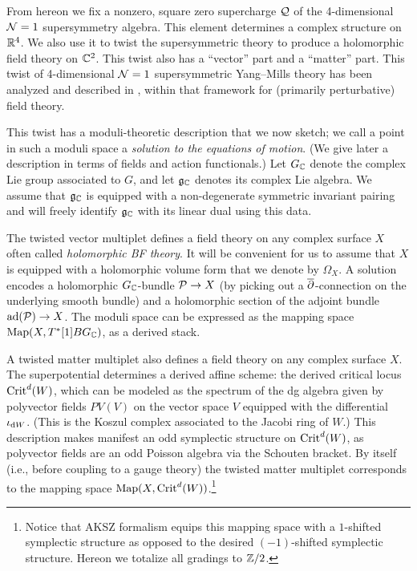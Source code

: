\documentclass[11pt]{amsart}
\begin{document}
From hereon we fix a nonzero, square zero supercharge $\mathcal Q$ of the 4-dimensional $\mathcal N=1$ supersymmetry algebra.
This element determines a complex structure on $\mathbb R^4$.
We also use it to twist the supersymmetric theory to produce a holomorphic field theory on $\mathbb C^2$.
This twist also has a ``vector'' part and a ``matter'' part.
This twist of 4-dimensional $\mathcal N=1$ supersymmetric Yang--Mills theory has been analyzed and described in \cite{CosYangian, ESW, SWchar}, within that framework for (primarily perturbative) field theory.

This twist has a moduli-theoretic description that we now sketch;
we call a point in such a moduli space a {\it solution to the equations of motion}. 
(We give later a description in terms of fields and action functionals.)
Let $G_\mathbb C$ denote the complex Lie group associated to $G$,
and let $\mathfrak g_\mathbb C$ denotes its complex Lie algebra.
We assume that $\mathfrak g_\mathbb C$ is equipped with a non-degenerate symmetric invariant pairing and will freely identify $\mathfrak g_\mathbb C$ with its linear dual using this data.

The twisted vector multiplet defines a field theory on any complex surface $X$ often called {\em holomorphic BF theory}. 
It will be convenient for us to assume that $X$ is equipped with a holomorphic volume form that we denote by $\Omega_X$. 
A solution encodes a holomorphic $G_\mathbb C$-bundle $\mathcal P \to X$ (by picking out a ${\overline{\partial}}$-connection on the underlying smooth bundle) and a holomorphic section of the adjoint bundle $\mathrm{ad}(\mathcal P) \to X$.
The moduli space can be expressed as the mapping space ${\rm Map}(X, T^*[1]BG_{\mathbb C})$, as a derived stack.

\def\Sslash{\!\sslash\!}

A twisted matter multiplet also defines a field theory on any complex surface $X$. 
The superpotential determines a derived affine scheme: the derived critical locus ${\rm Crit}^d(W)$, which can be modeled as the spectrum of the dg algebra given by polyvector fields $PV(V)$ on the vector space $V$ equipped with the differential~$\iota_{{\rm d} W}$.
(This is the Koszul complex associated to the Jacobi ring of $W$.)
This description makes manifest an odd symplectic structure on ${\rm Crit}^d(W)$,
as polyvector fields are an odd Poisson algebra via the Schouten bracket.
By itself (i.e., before coupling to a gauge theory) the twisted matter multiplet corresponds to the mapping space ${\rm Map}(X, {\rm Crit}^d(W))$.\footnote{Notice that AKSZ formalism equips this mapping space with a $1$-shifted symplectic structure as opposed to the desired $(-1)$-shifted symplectic structure.
Hereon we totalize all gradings to $\mathbb Z/2$.}
\end{document}
